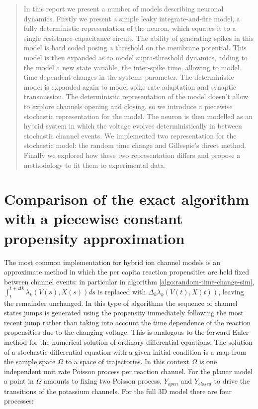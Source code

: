 \begin{abstract}
	In this report we present a number of models describing neuronal dynamics.
	Firstly we present a simple leaky integrate-and-fire model, a fully deterministic representation of the neuron, which equates it to a single resistance-capacitance circuit.
	The ability of generating spikes in this model is hard coded posing a threshold on the membrane potential.
	This model is then expanded as to model supra-threshold dynamics, adding to the model a new state variable, the inter-spike time, allowing to model time-dependent changes in the systems parameter.
	The deterministic model is expanded again to model spike-rate adaptation and synaptic transmission.
	The deterministic representation of the model doesn't allow to explore channels opening and closing, so we introduce a piecewise stochastic representation for the model.
	The neuron is then modelled as an hybrid system in which the voltage evolves deterministically in between stochastic channel events.
	We implemented two representation for the stochastic model: the random time change and Gillespie's direct method.
	Finally we explored how these two representation differs and propose a methodology to fit them to experimental data.
\end{abstract}










\section{Comparison of the exact algorithm with a piecewise constant propensity approximation}
The most common implementation for hybrid ion channel models is an approximate method in which the per capita reaction propensities are held fixed between channel events: in particular in algorithm \ref{algo:random-time-change-sim}, $\int_t^{t+\Delta k}\lambda_k(V(s), X(s))ds$ is replaced with $\Delta_k\lambda_k(V(t), X(t))$, leaving the remainder unchanged.
In this type of algorithms the sequence of channel states jumps is generated using the propensity immediately following the most recent jump rather than taking into account the time dependence of the reaction propensities due to the changing voltage.
This is analogous to the forward Euler method for the numerical solution of ordinary differential equations.
The solution of a stochastic differential equation with a given initial condition is a map from the sample space $\Omega$ to a space of trajectories.
In this context $\Omega$ is one independent unit rate Poisson process per reaction channel.
For the planar model a point in $\Omega$ amounts to fixing two Poisson process, $Y_{open}$ and $Y_{closed}$ to drive the transitions of the potassium channels.
For the full 3D model there are four processes:

